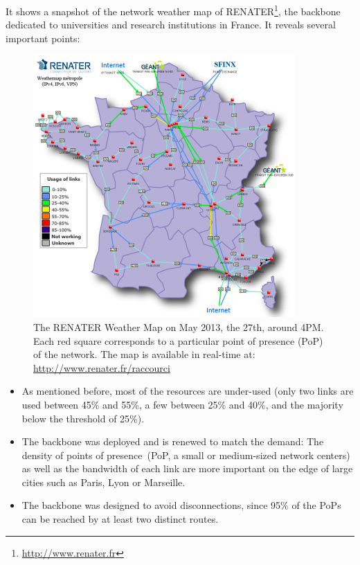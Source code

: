 It shows a snapshot of the network weather map of
RENATER\footnote{\href{http://www.renater.fr}{http://www.renater.fr}}, the backbone
dedicated to universities and research institutions in France. It reveals several
important points:
\begin{figure}[b]
\vspace*{-.3cm}
\includegraphics[width=10cm]{./FIGS/renater.png}
\centering\caption{The RENATER Weather Map on May 2013, the 27th, around 4PM.
Each red square corresponds to a particular point of presence (PoP) of the network. The map is available in real-time
at: \href{http://www.renater.fr/raccourci}{http://www.renater.fr/raccourci}}
\label{fig:renater}
\vspace*{-.3cm}
\end{figure}


\begin{itemize} 
\item As mentioned before, most of the resources are under-used (only two links are used
  between 45\% and 55\%, a few between 25\% and 40\%, and the majority below the threshold
  of 25\%).
\item The backbone was deployed and is renewed to match the demand: The density of points
  of presence~(PoP, \ie a small or medium-sized network centers) as well as the bandwidth
  of each link are more important on the edge of large cities such as Paris, Lyon or
  Marseille.
\item The backbone was designed to avoid disconnections, since 95\% of the PoPs can be
  reached by at least two distinct routes.
\end{itemize}


